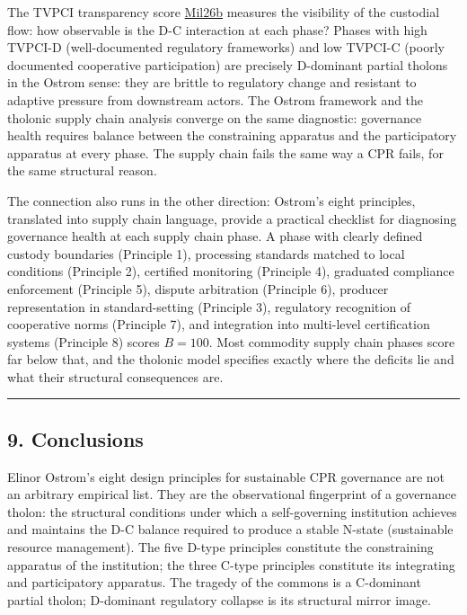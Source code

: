 \documentclass[
  11pt,
  letterpaper,
]{article}
\begin{document}
The TVPCI transparency score
\href{https://github.com/baardev/truevalue/blob/main/docnav/Research/papers/2_supply-chain-transparency-tvpci/2_supply-chain-transparency-tvpci.pdf}{Mil26b}
measures the visibility of the custodial flow: how observable is the D-C
interaction at each phase? Phases with high TVPCI-D (well-documented
regulatory frameworks) and low TVPCI-C (poorly documented cooperative
participation) are precisely D-dominant partial tholons in the Ostrom
sense: they are brittle to regulatory change and resistant to adaptive
pressure from downstream actors. The Ostrom framework and the tholonic
supply chain analysis converge on the same diagnostic: governance health
requires balance between the constraining apparatus and the
participatory apparatus at every phase. The supply chain fails the same
way a CPR fails, for the same structural reason.

The connection also runs in the other direction: Ostrom's eight
principles, translated into supply chain language, provide a practical
checklist for diagnosing governance health at each supply chain phase. A
phase with clearly defined custody boundaries (Principle 1), processing
standards matched to local conditions (Principle 2), certified
monitoring (Principle 4), graduated compliance enforcement (Principle
5), dispute arbitration (Principle 6), producer representation in
standard-setting (Principle 3), regulatory recognition of cooperative
norms (Principle 7), and integration into multi-level certification
systems (Principle 8) scores \(B = 100\). Most commodity supply chain
phases score far below that, and the tholonic model specifies exactly
where the deficits lie and what their structural consequences are.

\begin{center}\rule{0.5\linewidth}{0.5pt}\end{center}

\subsection{9. Conclusions}\label{conclusions}

Elinor Ostrom's eight design principles for sustainable CPR governance
are not an arbitrary empirical list. They are the observational
fingerprint of a governance tholon: the structural conditions under
which a self-governing institution achieves and maintains the D-C
balance required to produce a stable N-state (sustainable resource
management). The five D-type principles constitute the constraining
apparatus of the institution; the three C-type principles constitute its
integrating and participatory apparatus. The tragedy of the commons is a
C-dominant partial tholon; D-dominant regulatory collapse is its
structural mirror image.
\end{document}
